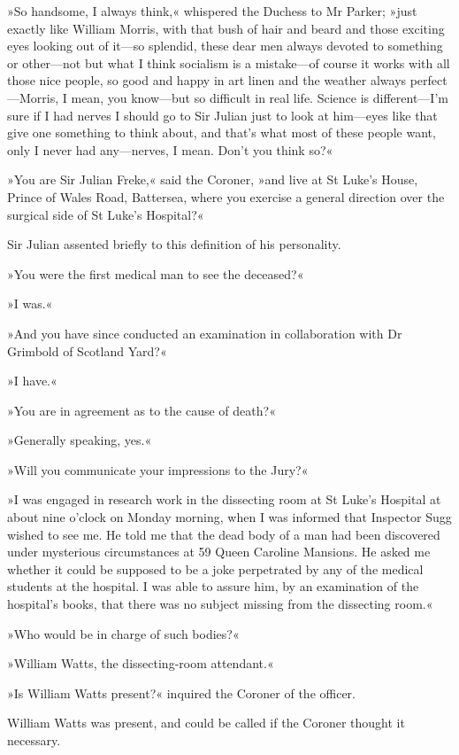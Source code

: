 »So handsome, I always think,« whispered the Duchess to Mr Parker; »just exactly like William Morris, with that bush of hair and beard and those exciting eyes looking out of it—so splendid, these dear men always devoted to something or other—not but what I think socialism is a mistake—of course it works with all those nice people, so good and happy in art linen and the weather always perfect—Morris, I mean, you know—but so difficult in real life. Science is different—I'm sure if I had nerves I should go to Sir Julian just to look at him—eyes like that give one something to think about, and that's what most of these people want, only I never had any—nerves, I mean. Don't you think so?«

»You are Sir Julian Freke,« said the Coroner, »and live at St Luke's House, Prince of Wales Road, Battersea, where you exercise a general direction over the surgical side of St Luke's Hospital?«

Sir Julian assented briefly to this definition of his personality.

»You were the first medical man to see the deceased?«

»I was.«

»And you have since conducted an examination in collaboration with Dr Grimbold of Scotland Yard?«

»I have.«

»You are in agreement as to the cause of death?«

»Generally speaking, yes.«

»Will you communicate your impressions to the Jury?«

»I was engaged in research work in the dissecting room at St Luke's Hospital at about nine o'clock on Monday morning, when I was informed that Inspector Sugg wished to see me. He told me that the dead body of a man had been discovered under mysterious circumstances at 59 Queen Caroline Mansions. He asked me whether it could be supposed to be a joke perpetrated by any of the medical students at the hospital. I was able to assure him, by an examination of the hospital's books, that there was no subject missing from the dissecting room.«

»Who would be in charge of such bodies?«

»William Watts, the dissecting-room attendant.«

»Is William Watts present?« inquired the Coroner of the officer.

William Watts was present, and could be called if the Coroner thought it necessary.


